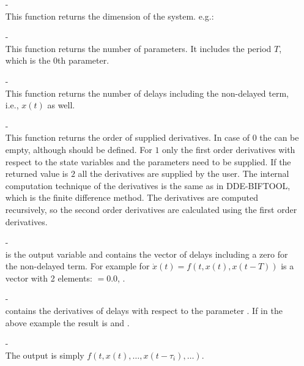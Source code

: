 \documentclass[10pt,a4paper]{ddedoc}
\begin{document}
\begin{itemize}
  \item[-]  \\ 
  This function returns the dimension of the
  system. e.g.: 
  
  \item[-]  \\ 
  This function returns the number of parameters. It
  includes the period $T$, which is the 0th parameter.
  
  \item[-]  \\ 
  This function returns the number of delays including the non-delayed term, i.e., $x ( t )$ as well.
  
  \item[-]  \\ 
  This function returns the order of supplied derivatives. In case of $0$ the  can be empty, although should be defined. For $1$ only the first order derivatives with respect to the state variables and the parameters need to be supplied. If the returned value is $2$ all the derivatives are supplied by the user. The internal computation technique of the derivatives is the same as in DDE-BIFTOOL, which is the finite difference method. The derivatives are computed recursively, so the second order derivatives are calculated using the first order derivatives.
  
  \item[-]  \\
   is the output variable and contains the vector of delays
  including a zero for the non-delayed term. For example for $\dot{x} ( t ) =
  f ( t, x ( t ), x ( t - T ) )$  is a vector with 2 elements:
  $=0.0$, .
  
  \item[-]  \\
   contains the derivatives of delays with respect to the parameter
  . If  in the above example the result is
   and .
  
  \item[-]  \\ 
  The output  is simply $f ( t, x ( t ), \ldots, x ( t - \tau_i ), \ldots )$.
  

\end{itemize}
\end{document}
